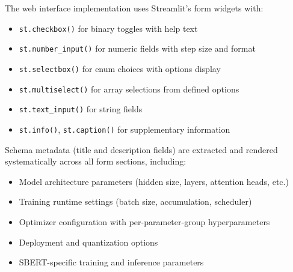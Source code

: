 The web interface implementation uses Streamlit's form widgets with:
\begin{itemize}[leftmargin=*]
    \item \texttt{st.checkbox()} for binary toggles with help text
    \item \texttt{st.number\_input()} for numeric fields with step size and format
    \item \texttt{st.selectbox()} for enum choices with options display
    \item \texttt{st.multiselect()} for array selections from defined options
    \item \texttt{st.text\_input()} for string fields
    \item \texttt{st.info()}, \texttt{st.caption()} for supplementary information
\end{itemize}

Schema metadata (title and description fields) are extracted and rendered systematically across all form sections, including:
\begin{itemize}[leftmargin=*]
    \item Model architecture parameters (hidden size, layers, attention heads, etc.)
    \item Training runtime settings (batch size, accumulation, scheduler)
    \item Optimizer configuration with per-parameter-group hyperparameters
    \item Deployment and quantization options
    \item SBERT-specific training and inference parameters
\end{itemize}

